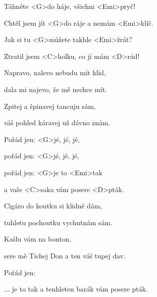 

\zs
Táhněte <G>do háje, všichni <Emi>pryč!

Chtěl jsem jít <G>do ráje a nemám <Emi>klíč.

Jak si tu <G>můžete takhle <Emi>žrát?

Ztratil jsem <C>holku, co jí mám <D>rád!
\ks

\zs
Napravo, nalevo nebudu mít klid,

dala mi najevo, že mě nechce mít.

Zpitej a špinavej tancuju sám,

váš pohled káravej už dávno znám.
\ks

\zr
Pořád jen:  <G>jé, jé, jé,

pořád jen:  <G>jé, jé, jé,

pořád jen:  <G>je to <Emi>tak

a vaše <C>saka vám posere <D>pták.
\kr

\zs
Cigáro do koutku si klidně dám,

tuhletu pochoutku vychutnám sám.

Kašlu vám na bonton, 

sere mě Tichej Don a ten váš tupej dav.
\ks

\zr \kr

\zr
Pořád jen: 

... je to tak a tenhleten barák vám posere pták.
\kr

\kp





